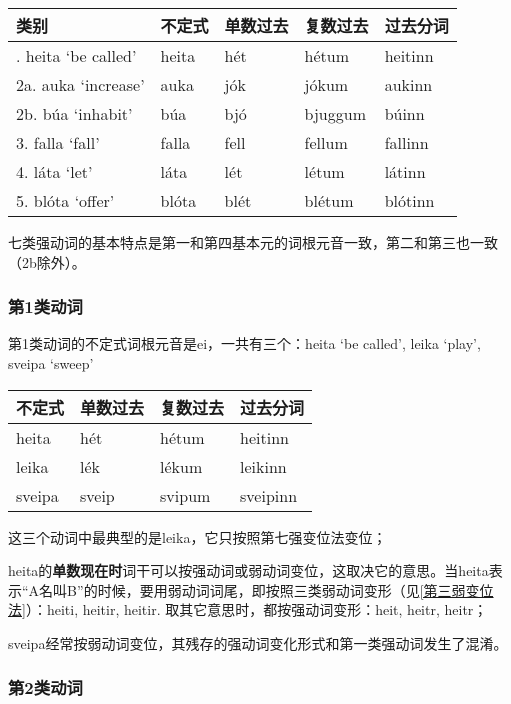 \begin{longtable}{lllll}
    \toprule
    类别                   & 不定式   & 单数过去 & 复数过去    & 过去分词    \\
    \midrule
    \endhead
    \bottomrule
    \endfoot
    1. heita `be called‌' & heita & hét  & hétum   & heitinn \\
    2a. auka `increase‌'  & auka  & jók  & jókum   & aukinn  \\
    2b. búa `inhabit‌'    & búa   & bjó  & bjuggum & búinn   \\
    3. falla `fall‌'      & falla & fell & fellum  & fallinn \\
    4. láta `let‌'        & láta  & lét  & létum   & látinn  \\
    5. blóta `offer‌'     & blóta & blét & blétum  & blótinn \\
\end{longtable}

七类强动词的基本特点是第一和第四基本元的词根元音一致，第二和第三也一致（2b除外）。

\subsubsection{第1类动词}

第1类动词的不定式词根元音是ei，一共有三个：heita `be called', leika
`play', sveipa `sweep'

\begin{longtable}{llll}
    \toprule
    不定式    & 单数过去  & 复数过去   & 过去分词     \\
    \midrule
    \endhead
    \bottomrule
    \endfoot
    heita  & hét   & hétum  & heitinn  \\
    leika  & lék   & lékum  & leikinn  \\
    sveipa & sveip & svipum & sveipinn \\
\end{longtable}

这三个动词中最典型的是leika，它只按照第七强变位法变位；

heita的\textbf{单数现在时}词干可以按强动词或弱动词变位，这取决它的意思。当heita表示“A名叫B”的时候，要用弱动词词尾，即按照三类弱动词变形（见\ref{第三弱变位法}）：heiti, heitir, heitir. 取其它意思时，都按强动词变形：heit, heitr, heitr；

sveipa经常按弱动词变位，其残存的强动词变化形式和第一类强动词发生了混淆。

\subsubsection{第2类动词}


